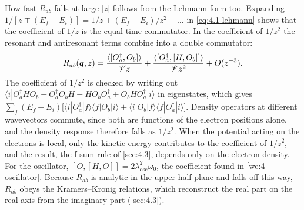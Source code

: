 How fast $R_{ab}$ falls at large $|z|$ follows from the Lehmann form too. Expanding $1/[z \mp (E_f - E_i)] = 1/z \pm (E_f - E_i)/z^2 + \dots$ in \cref{eq:4.1-lehmann} shows that the coefficient of $1/z$ is the equal-time commutator. In the coefficient of $1/z^2$ the resonant and antiresonant terms combine into a double commutator:
\begin{equation}
  R_{ab}(\bm{q},z) = \frac{\langle[O_a^\dagger, O_b]\rangle}{\mathscr{V} z} + \frac{\langle[O_a^\dagger, [H, O_b]]\rangle}{\mathscr{V} z^2} + O(z^{-3}) .
  \label{eq:4.1-tail}
\end{equation}
The coefficient of $1/z^2$ is checked by writing out $\langle i|O_a^\dagger HO_b - O_a^\dagger O_bH - HO_bO_a^\dagger + O_bHO_a^\dagger|i\rangle$ in eigenstates, which gives $\sum_f(E_f - E_i)\bigl[\langle i|O_a^\dagger|f\rangle\langle f|O_b|i\rangle + \langle i|O_b|f\rangle\langle f|O_a^\dagger|i\rangle\bigr]$. Density operators at different wavevectors commute, since both are functions of the electron positions alone, and the density response therefore falls as $1/z^2$. When the potential acting on the electrons is local, only the kinetic energy contributes to the coefficient of $1/z^2$, and the result, the f-sum rule of \cref{sec:4.3}, depends only on the electron density. For the oscillator, $[O, [H, O]] = 2\lambda_{\mathrm{osc}}^2\omega_0$, the coefficient found in \cref{we:4-oscillator}. Because $R_{ab}$ is analytic in the upper half plane and falls off this way, $R_{ab}$ obeys the Kramers--Kronig relations, which reconstruct the real part on the real axis from the imaginary part (\cref{sec:4.3}).


